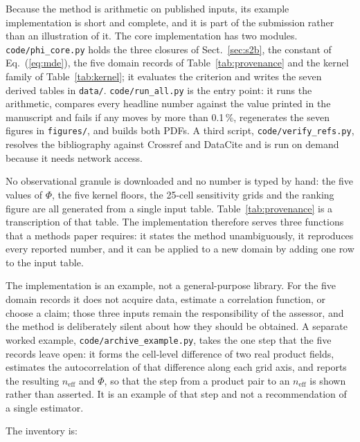 \documentclass[preprint,12pt,authoryear]{elsarticle}
\begin{document}
Because the method is arithmetic on published inputs, its example implementation is short and complete, and it is part of the submission rather than an illustration of it. The core implementation has two modules. \texttt{code/phi\_core.py} holds the three closures of Sect.~\ref{sec:s2b}, the constant of Eq.~(\ref{eq:mde}), the five domain records of Table~\ref{tab:provenance} and the kernel family of Table~\ref{tab:kernel}; it evaluates the criterion and writes the seven derived tables in \texttt{data/}. \texttt{code/run\_all.py} is the entry point: it runs the arithmetic, compares every headline number against the value printed in the manuscript and fails if any moves by more than 0.1\,\%, regenerates the seven figures in \texttt{figures/}, and builds both PDFs. A third script, \texttt{code/verify\_refs.py}, resolves the bibliography against Crossref and DataCite and is run on demand because it needs network access.

No observational granule is downloaded and no number is typed by hand: the five values of $\Phi$, the five kernel floors, the 25-cell sensitivity grids and the ranking figure are all generated from a single input table. Table~\ref{tab:provenance} is a transcription of that table. The implementation therefore serves three functions that a methods paper requires: it states the method unambiguously, it reproduces every reported number, and it can be applied to a new domain by adding one row to the input table.

The implementation is an example, not a general-purpose library. For the five domain records it does not acquire data, estimate a correlation function, or choose a claim; those three inputs remain the responsibility of the assessor, and the method is deliberately silent about how they should be obtained. A separate worked example, \texttt{code/archive\_example.py}, takes the one step that the five records leave open: it forms the cell-level difference of two real product fields, estimates the autocorrelation of that difference along each grid axis, and reports the resulting $n_{\mathrm{eff}}$ and $\Phi$, so that the step from a product pair to an $n_{\mathrm{eff}}$ is shown rather than asserted. It is an example of that step and not a recommendation of a single estimator.

The inventory is:
\end{document}
